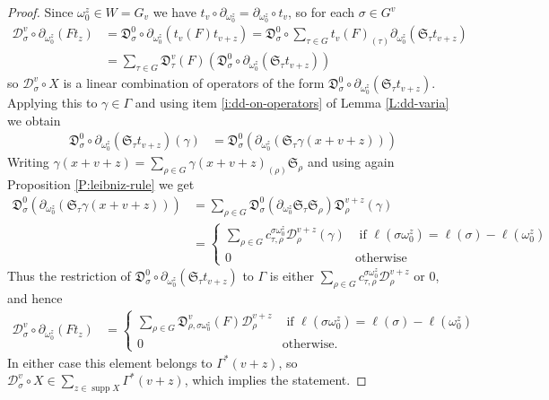 \documentclass[11pt,fleqn]{article}
\newcommand\D{\mathfrak D}
\newcommand\DD{\mathcal D}
\renewcommand\SS{\mathfrak S}
\DeclareMathOperator\supp{supp}
\begin{document}
\begin{proof}
Since $\omega_0^z \in W = G_v$ we have $t_v \circ \partial_{\omega_0^z} = 
\partial_{\omega_0^z} \circ t_v$, so for each $\sigma \in G^v$
\begin{align*}
	\DD_\sigma^v \circ \partial_{\omega_0^z} \left( F t_z \right) 
	&= \D_\sigma^0 \circ \partial_{\omega^z_0}(t_v(F) t_{v+z})
	=  \D_\sigma^0 \circ \sum_{\tau \in G} t_v(F)_{(\tau)}
		\partial_{\omega^z_0}(\SS_\tau t_{v+z}) \\
	&= \sum_{\tau \in G} \D_\tau^v (F) 
		(\D_\sigma^0 \circ \partial_{\omega^z_0}(\SS_\tau t_{v+z}) )
\end{align*} 
so $\DD_\sigma^v \circ X$ is a linear combination of operators of the form 
$\D_\sigma^0 \circ \partial_{\omega^z_0}(\SS_\tau t_{v+z})$. Applying
this to $\gamma \in \Gamma$ and using item \ref{i:dd-on-operators} of Lemma
\ref{L:dd-varia} we obtain
\begin{align*}
\D_\sigma^0 \circ \partial_{\omega^z_0}(\SS_\tau t_{v+z})(\gamma)
	&= \D_\sigma^0(\partial_{\omega^z_0}(\SS_\tau \gamma(x+v+z)))
\end{align*}
Writing $\gamma(x+v+z) = \sum_{\rho \in G} \gamma(x+v+z)_{(\rho)} 
\SS_\rho$ and using again Proposition \ref{P:leibniz-rule} we get
\begin{align*}
\D_\sigma^0(\partial_{\omega^z_0}(\SS_\tau \gamma(x+v+z)))
	&= \sum_{\rho \in G}
		\D_\sigma^0(\partial_{\omega^z_0}\SS_\tau \SS_\rho) 
		 \D_\rho^{v+z}(\gamma)\\
	&= \begin{cases}
		\sum_{\rho \in G} c^{\sigma \omega_0^z}_{\tau, \rho} 
		\DD_\rho^{v+z}(\gamma) 
			& \mbox{ if } \ell(\sigma \omega_0^z) 
				= \ell(\sigma) - \ell(\omega_0^z) \\
		0 & \mbox{otherwise}
	\end{cases}
\end{align*}
Thus the restriction of $\D_\sigma^0 \circ \partial_{\omega^z_0}(\SS_\tau 
t_{v+z})$ to $\Gamma$ is either $\sum_{\rho \in G} 
c^{\sigma \omega_0^z}_{\tau, \rho} \DD^{v+z}_\rho$ or $0$, and hence
\begin{align*}
\DD_\sigma^v \circ \partial_{\omega_0^z} \left(F t_z \right)
	&= 
	\begin{cases}
	\sum_{\rho \in G} \D_{\rho, \sigma\omega^z_0}^v(F) \DD_\rho^{v+z}
		& \mbox{ if } \ell(\sigma \omega_0^z) = 
			\ell(\sigma) - \ell(\omega_0^z) \\
	0 & \mbox{otherwise.}	
	\end{cases}
\end{align*}
In either case this element belongs to $\Gamma^*(v+z)$, so $\DD_\sigma^v 
\circ X \in \sum_{z \in \supp X} \Gamma^*(v+z)$, which implies the statement.
\end{proof}
\end{document}
